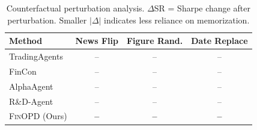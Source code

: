 \begin{table}[t]
\renewcommand{\arraystretch}{0.95}
\footnotesize
\caption{Counterfactual perturbation analysis. $\Delta$SR = Sharpe change after perturbation. Smaller $|\Delta|$ indicates less reliance on memorization.}
\setlength{\abovecaptionskip}{0.1cm}
\centering
\setlength{\tabcolsep}{3pt}
\begin{tabular}{lccc}
\toprule
Method & News Flip & Figure Rand. & Date Replace \\
\midrule
TradingAgents & -- & -- & -- \\
FinCon & -- & -- & -- \\
AlphaAgent & -- & -- & -- \\
R\&D-Agent & -- & -- & -- \\
\textsc{FinOPD} (Ours) & \textbf{--} & \textbf{--} & \textbf{--} \\
\bottomrule
\end{tabular}
\label{tab:counterfactual}
\end{table}
